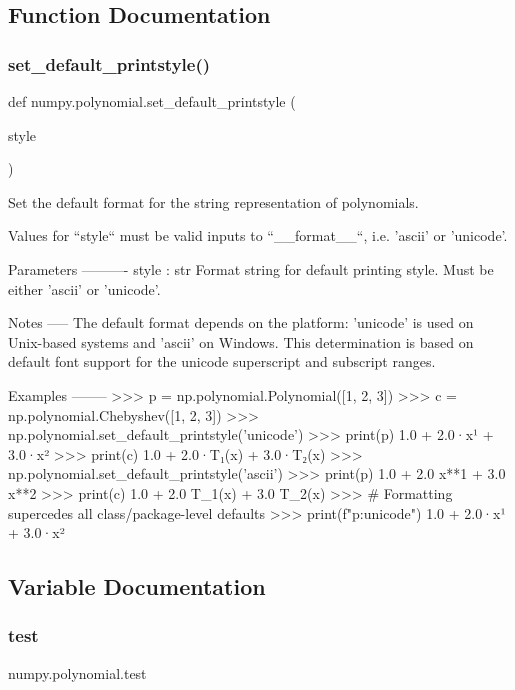 \subsection{Function Documentation}
\mbox{\label{namespacenumpy_1_1polynomial_a72683cf4fec4df5aaca959cdbab278a0}} 
\subsubsection{\texorpdfstring{set\+\_\+default\+\_\+printstyle()}{set\_default\_printstyle()}}
{\footnotesize\ttfamily def numpy.\+polynomial.\+set\+\_\+default\+\_\+printstyle (\begin{DoxyParamCaption}\item[{}]{style }\end{DoxyParamCaption})}

\begin{DoxyVerb}Set the default format for the string representation of polynomials.

Values for ``style`` must be valid inputs to ``__format__``, i.e. 'ascii'
or 'unicode'.

Parameters
----------
style : str
    Format string for default printing style. Must be either 'ascii' or
    'unicode'.

Notes
-----
The default format depends on the platform: 'unicode' is used on
Unix-based systems and 'ascii' on Windows. This determination is based on
default font support for the unicode superscript and subscript ranges.

Examples
--------
>>> p = np.polynomial.Polynomial([1, 2, 3])
>>> c = np.polynomial.Chebyshev([1, 2, 3])
>>> np.polynomial.set_default_printstyle('unicode')
>>> print(p)
1.0 + 2.0·x¹ + 3.0·x²
>>> print(c)
1.0 + 2.0·T₁(x) + 3.0·T₂(x)
>>> np.polynomial.set_default_printstyle('ascii')
>>> print(p)
1.0 + 2.0 x**1 + 3.0 x**2
>>> print(c)
1.0 + 2.0 T_1(x) + 3.0 T_2(x)
>>> # Formatting supercedes all class/package-level defaults
>>> print(f"{p:unicode}")
1.0 + 2.0·x¹ + 3.0·x²
\end{DoxyVerb}
 

\subsection{Variable Documentation}
\mbox{\label{namespacenumpy_1_1polynomial_ab69cac4b8a52e2993a7792c06ba62e77}} 
\subsubsection{\texorpdfstring{test}{test}}
{\footnotesize\ttfamily numpy.\+polynomial.\+test}

